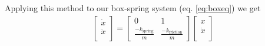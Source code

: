 \documentclass[11pt, oneside]{article}   	%
\begin{document}
Applying this method to our box-spring system (eq. \ref{eq:boxeq}) we get
\begin{align}
\begin{bmatrix}
        \dot{x} \\
        \ddot{x} \\
      \end{bmatrix}
  =
      \begin{bmatrix}
        0 & 1 \\
        \frac{-k_\mathrm{spring}}{m} & \frac{-k_\mathrm{friction}}{m}
      \end{bmatrix}
      \begin{bmatrix}
        x \\
        \dot{x} \\
      \end{bmatrix}
\end{align}
\end{document}
